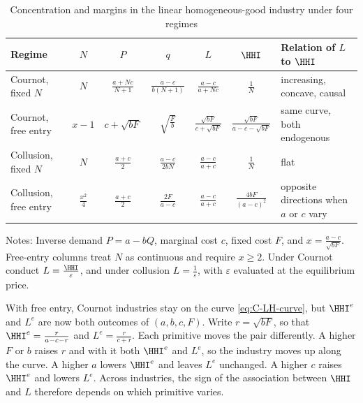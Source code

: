 \begin{table}[htbp]
\centering
\begin{threeparttable}
\caption{Concentration and margins in the linear homogeneous-good industry under four regimes}
\label{tab:C-cournot-cases}
\small
\setlength{\tabcolsep}{4pt}
\begin{tabular}{@{}lccccc>{\raggedright\arraybackslash}p{2.75cm}@{}}
\toprule
Regime & $N$ & $P$ & $q$ & $L$ & $\HHI$ & Relation of $L$ to $\HHI$ \\
\midrule
Cournot, fixed $N$ & $N$ & $\frac{a + Nc}{N + 1}$ & $\frac{a - c}{b(N + 1)}$ & $\frac{a - c}{a + Nc}$ &
  $\frac{1}{N}$ & increasing, concave, causal \\
\addlinespace
Cournot, free entry & $x - 1$ & $c + \sqrt{bF}$ & $\sqrt{\frac{F}{b}}$ & $\frac{\sqrt{bF}}{c + \sqrt{bF}}$ &
  $\frac{\sqrt{bF}}{a - c - \sqrt{bF}}$ & same curve, both endogenous \\
\addlinespace
Collusion, fixed $N$ & $N$ & $\frac{a + c}{2}$ & $\frac{a - c}{2bN}$ & $\frac{a - c}{a + c}$ & $\frac{1}{N}$ &
  flat \\
\addlinespace
Collusion, free entry & $\frac{x^2}{4}$ & $\frac{a + c}{2}$ & $\frac{2F}{a - c}$ & $\frac{a - c}{a + c}$ &
  $\frac{4bF}{(a - c)^2}$ & opposite directions when $a$ or $c$ vary \\
\bottomrule
\end{tabular}
\begin{tablenotes}\footnotesize
\item Notes: Inverse demand $P = a - bQ$, marginal cost $c$, fixed cost $F$, and $x = \frac{a - c}{\sqrt{bF}}$.
Free-entry columns treat $N$ as continuous and require $x \ge 2$. Under Cournot conduct $L = \frac{\HHI}{\varepsilon}$,
and under collusion $L = \frac{1}{\varepsilon}$, with $\varepsilon$ evaluated at the equilibrium price.
\end{tablenotes}
\end{threeparttable}
\end{table}

With free entry, Cournot industries stay on the curve \eqref{eq:C-LH-curve}, but $\HHI^e$ and $L^e$ are now
both outcomes of $(a, b, c, F)$. Write $r = \sqrt{bF}$, so that $\HHI^e = \frac{r}{a - c - r}$ and
$L^e = \frac{r}{c + r}$. Each primitive moves the pair differently. A higher $F$ or $b$ raises $r$ and with it
both $\HHI^e$ and $L^e$, so the industry moves up along the curve. A higher $a$ lowers $\HHI^e$ and leaves $L^e$
unchanged. A higher $c$ raises $\HHI^e$ and lowers $L^e$. Across industries, the sign of the association
between $\HHI$ and $L$ therefore depends on which primitive varies.

